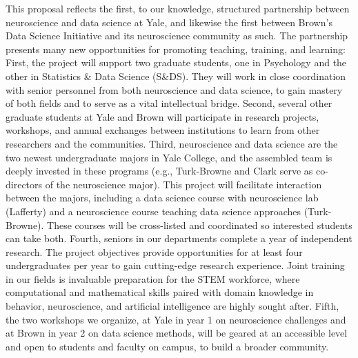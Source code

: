 
This proposal reflects the first, to our knowledge, structured
partnership between neuroscience and data science at Yale, and likewise the first between Brown's Data Science Initiative and its neuroscience community as such. The partnership
presents many new opportunities for promoting teaching, training, and
learning: First, the project will support two graduate students, one in
Psychology and the other in Statistics \& Data Science (S\&DS). They will
work in close coordination with senior personnel from both neuroscience
and data science, to gain mastery of both fields and to serve as a vital intellectual bridge. Second, several other
graduate students at Yale and Brown will participate in research
projects, workshops, and annual exchanges between institutions to learn
from other researchers and the communities. Third, neuroscience and data
science are the two newest undergraduate majors in Yale College, and the
assembled team is deeply invested in these programs (e.g., Turk-Browne
and Clark serve as co-directors of the neuroscience major). This project
will facilitate interaction between the majors, including a data science
course with neuroscience lab (Lafferty) and a neuroscience course
teaching data science approaches (Turk-Browne). These courses will be
cross-listed and coordinated so interested students can take both.
Fourth, seniors in our departments complete a year of independent
research. The project objectives provide opportunities for at least four
undergraduates per year to gain cutting-edge research experience. Joint
training in our fields is invaluable preparation for the STEM workforce,
where computational and mathematical skills paired with domain knowledge
in behavior, neuroscience, and artificial intelligence are highly sought
after. Fifth, the two workshops we organize, at Yale in year 1 on
neuroscience challenges and at Brown in year 2 on data science methods, will be geared at an accessible level and open to students and faculty on campus, to build
a broader community.


